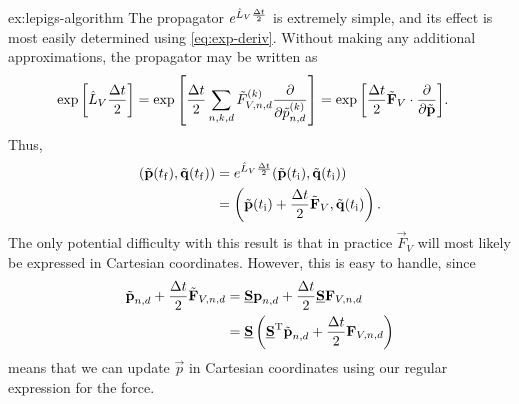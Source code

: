 \begin{DefAnswer}{ex:lepigs-algorithm}
	The propagator $e^{\hat{L}_V \frac{\Delta t}{2}}$ is extremely simple, and its effect is most easily determined using \cref{eq:exp-deriv}.
	Without making any additional approximations, the propagator may be written as
	\begin{align}
		\exp{\left[ \hat{L}_V \frac{\Delta t}{2} \right]}
		&= \exp{\left[ \frac{\Delta t}{2} \sum_{n,k,d} \tilde{F}_{V,n,d}^{(k)} \frac{\partial}{\partial \tilde{p}_{n,d}^{(k)}} \right]}
		= \exp{\left[ \frac{\Delta t}{2} \tilde{\bm{\mathbf{F}}}_{V} \cdot \frac{\partial}{\partial \tilde{\bm{\mathbf{p}}}} \right]}.
	\end{align}
	Thus,
	\begin{subequations}
	\begin{align}
		(\tilde{\bm{\mathbf{p}}}(t_\mathrm{f}), \tilde{\bm{\mathbf{q}}}(t_\mathrm{f}))
		&= e^{\hat{L}_V \frac{\Delta t}{2}} (\tilde{\bm{\mathbf{p}}}(t_\mathrm{i}), \tilde{\bm{\mathbf{q}}}(t_\mathrm{i})) \\
		&= \left( \tilde{\bm{\mathbf{p}}}(t_\mathrm{i}) + \frac{\Delta t}{2} \tilde{\bm{\mathbf{F}}}_V, \tilde{\bm{\mathbf{q}}}(t_\mathrm{i}) \right).
	\end{align}
	\end{subequations}
	The only potential difficulty with this result is that in practice $\vec{F}_V$ will most likely be expressed in Cartesian coordinates.
	However, this is easy to handle, since
	\begin{subequations}
	\begin{align}
		\tilde{\bm{\mathbf{p}}}_{n,d} + \frac{\Delta t}{2} \tilde{\bm{\mathbf{F}}}_{V,n,d}
		&= \underline{\bm{\mathbf{S}}} \bm{\mathbf{p}}_{n,d} + \frac{\Delta t}{2} \underline{\bm{\mathbf{S}}} \bm{\mathbf{F}}_{V,n,d} \\
		&= \underline{\bm{\mathbf{S}}} \left( \underline{\bm{\mathbf{S}}}^\mathrm{T} \tilde{\bm{\mathbf{p}}}_{n,d} + \frac{\Delta t}{2} \bm{\mathbf{F}}_{V,n,d} \right)
	\end{align}
	\end{subequations}
	means that we can update $\vec{p}$ in Cartesian coordinates using our regular expression for the force.


\end{DefAnswer}
